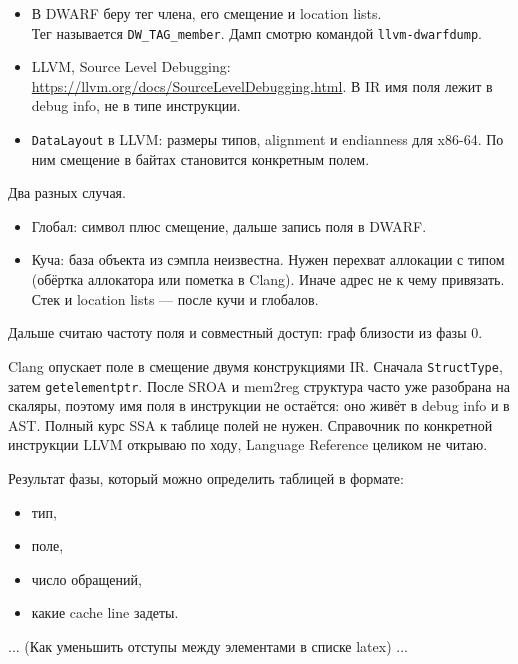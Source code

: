 \documentclass[a4paper,12pt]{article}
\begin{document}
\begin{ai}
\begin{itemize}
    \item В DWARF беру тег члена, его смещение и location lists. \\
    Тег называется \texttt{DW\_TAG\_member}. Дамп смотрю командой
    \texttt{llvm-dwarfdump}.
    \item LLVM, Source Level Debugging:
    \url{https://llvm.org/docs/SourceLevelDebugging.html}.
    В IR имя поля лежит в debug info, не в типе инструкции.
    \item \texttt{DataLayout} в LLVM: размеры типов, alignment и
    endianness для x86-64. По ним смещение в байтах становится
    конкретным полем.
\end{itemize}

Два разных случая.

\begin{itemize}
    \item Глобал: символ плюс смещение, дальше запись поля в DWARF.
    \item Куча: база объекта из сэмпла неизвестна. Нужен перехват
    аллокации с типом (обёртка аллокатора или пометка в Clang).
    Иначе адрес не к чему привязать. Стек и location lists --- после
    кучи и глобалов.
\end{itemize}

Дальше считаю частоту поля и совместный доступ: граф близости из
фазы 0.

Clang опускает поле в смещение двумя конструкциями IR.
Сначала \texttt{StructType}, затем \texttt{getelementptr}.
После SROA и mem2reg
структура часто уже разобрана на скаляры, поэтому имя поля в
инструкции не остаётся: оно живёт в debug info и в AST. Полный курс
SSA к таблице полей не нужен. Справочник по конкретной инструкции
LLVM открываю по ходу, Language Reference целиком не читаю.

\end{ai}

Результат фазы, который можно определить таблицей в формате:

\begin{itemize}
    \item тип,
    \item поле, 
    \item число обращений,
    \item какие cache line задеты.
\end{itemize}

... (Как уменьшить отступы между элементами в списке latex) ...
\end{document}

